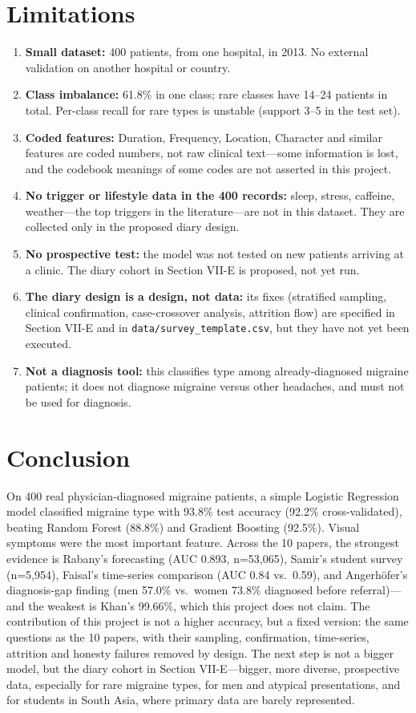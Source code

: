 \documentclass[conference]{IEEEtran}
\begin{document}
\section{Limitations}
\begin{enumerate}
\item \textbf{Small dataset:} 400 patients, from one hospital, in 2013. No external validation on another hospital or country.
\item \textbf{Class imbalance:} 61.8\% in one class; rare classes have 14--24 patients in total. Per-class recall for rare types is unstable (support 3--5 in the test set).
\item \textbf{Coded features:} Duration, Frequency, Location, Character and similar features are coded numbers, not raw clinical text---some information is lost, and the codebook meanings of some codes are not asserted in this project.
\item \textbf{No trigger or lifestyle data in the 400 records:} sleep, stress, caffeine, weather---the top triggers in the literature---are not in this dataset. They are collected only in the proposed diary design.
\item \textbf{No prospective test:} the model was not tested on new patients arriving at a clinic. The diary cohort in Section VII-E is proposed, not yet run.
\item \textbf{The diary design is a design, not data:} its fixes (stratified sampling, clinical confirmation, case-crossover analysis, attrition flow) are specified in Section VII-E and in \texttt{data/survey\_template.csv}, but they have not yet been executed.
\item \textbf{Not a diagnosis tool:} this classifies type among already-diagnosed migraine patients; it does not diagnose migraine versus other headaches, and must not be used for diagnosis.
\end{enumerate}

\section{Conclusion}
On 400 real physician-diagnosed migraine patients, a simple Logistic Regression model classified migraine type with 93.8\% test accuracy (92.2\% cross-validated), beating Random Forest (88.8\%) and Gradient Boosting (92.5\%). Visual symptoms were the most important feature. Across the 10 papers, the strongest evidence is Rabany's forecasting (AUC 0.893, n=53,065), Samir's student survey (n=5,954), Faisal's time-series comparison (AUC 0.84 vs.\ 0.59), and Angerh\"ofer's diagnosis-gap finding (men 57.0\% vs.\ women 73.8\% diagnosed before referral)---and the weakest is Khan's 99.66\%, which this project does not claim. The contribution of this project is not a higher accuracy, but a fixed version: the same questions as the 10 papers, with their sampling, confirmation, time-series, attrition and honesty failures removed by design. The next step is not a bigger model, but the diary cohort in Section VII-E---bigger, more diverse, prospective data, especially for rare migraine types, for men and atypical presentations, and for students in South Asia, where primary data are barely represented.
\end{document}
